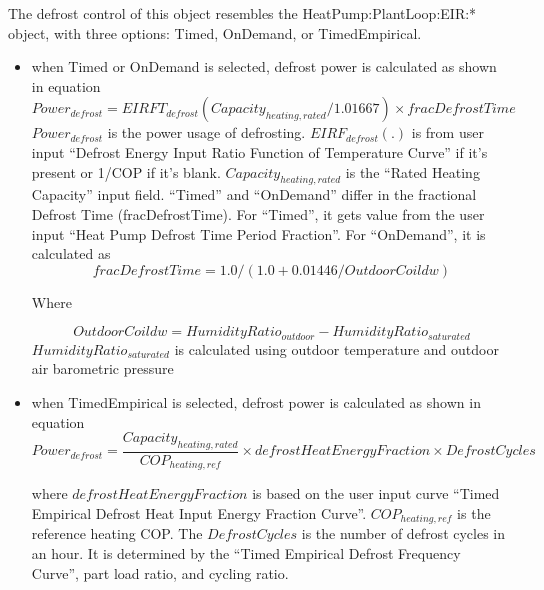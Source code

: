 The defrost control of this object resembles the HeatPump:PlantLoop:EIR:*
object, with three options: Timed, OnDemand, or TimedEmpirical.
\begin{itemize}
  \item 
when Timed or OnDemand is selected, defrost power is calculated as shown in
equation  
\begin{equation}
Power_{defrost} = EIRFT_{defrost}(Capacity_{heating,rated}/1.01667) \times fracDefrostTime  
\end{equation}
$Power_{defrost}$ is the power usage of defrosting.
$EIRF_{defrost}(.)$ is from user input ``Defrost Energy Input Ratio Function of
Temperature Curve'' if it's present or 1/COP if it's blank. $Capacity_{heating,rated}$
is the ``Rated Heating Capacity'' input field. ``Timed'' and ``OnDemand'' differ in
the fractional Defrost Time (fracDefrostTime). For ``Timed'', it gets value from
the user input ``Heat Pump Defrost Time Period Fraction''. For ``OnDemand'', it is
calculated as 
\begin{equation}
fracDefrostTime =1.0 / (1.0 + 0.01446 / OutdoorCoildw) 
\end{equation}

Where

\begin{equation}
OutdoorCoildw=HumidityRatio_{outdoor}-HumidityRatio_{saturated}              
\end{equation}
$HumidityRatio_{saturated}$ is calculated using outdoor temperature and outdoor air barometric pressure

\item when TimedEmpirical is selected, defrost power is calculated as shown in equation 
\begin{equation}
Power_{defrost}=\frac{Capacity_{heating,rated}}{COP_{heating,ref}} \times
defrostHeatEnergyFraction \times DefrostCycles                                           
\end{equation}

where $defrostHeatEnergyFraction$ is based on the user input curve ``Timed Empirical Defrost Heat Input Energy Fraction Curve''. 
$COP_{heating,ref}$ is the reference heating COP. The $DefrostCycles$ is the number of defrost cycles in an hour. 
It is determined by the ``Timed Empirical Defrost Frequency Curve'', part load ratio, and cycling ratio.

\end{itemize}

